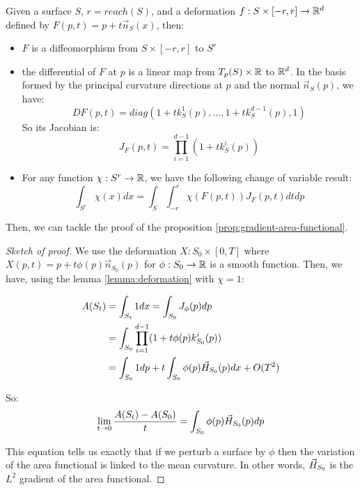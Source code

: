 \begin{lemma}
    \label{lemma:diffeo}

    Given a surface $ S $, $ r = reach(S) $, and a deformation $ f : S \times
    [-r, r] \to \mathbb{R}^d $ defined by $ F(p, t) = p + t \vec{n}_S(x) $, then:

    \begin{itemize}
        \item $ F $ is a diffeomorphism from $ S \times [-r, r] $ to $ S^r $
        \item the differential of $ F $ at $ p $ is a linear map from $ T_p(S)
            \times \mathbb{R} $ to $ \mathbb{R}^d $. In the basis formed by the principal
            curvature directions at $ p $ and the normal $ \vec{n}_S(p) $, we have:
            \begin{equation}
                D F(p, t) = diag(1 + t k^1_S(p), \ldots, 1 + t k^{d-1}_S(p), 1)
            \end{equation}
            So its Jacobian is:
            \begin{equation}
                J_F(p, t) = \prod_{i=1}^{d-1} (1 + t k^i_S(p))
            \end{equation}
        \item For any function $ \chi : S^r \to \mathbb{R} $, we have the following
            change of variable result:
            \begin{equation}
                \int_{S^r} \chi(x) dx = \int_S \int_{-r}^r \chi(F(p, t)) J_F(p,
                t) dt dp
            \end{equation}
    \end{itemize}
\end{lemma}

Then, we can tackle the proof of the proposition
\ref{prop:gradient-area-functional}.

\begin{proof}[Sketch of proof]
    We use the deformation $ X : S_0 \times [0, T] $ where $ X(p, t) = p + t
    \phi(p) \vec{n}_{S_0}(p) $ for $ \phi : S_0 \to \mathbb{R} $ is a smooth
    function. Then, we have, using the lemma \ref{lemma:deformation} with $ \chi
    = 1 $:

    \begin{align*}
        A(S_t) &= \int_{S_t} 1 dx = \int_{S_0} J_{\phi}(p) dp \\
        &= \int_{S_0} \prod_{i=1}^{d-1} (1 + t \phi(p) k^i_{S_0}(p)) \\
        &= \int_{S_0} 1 dp + t \int_{S_0} \phi(p) \vec{H}_{S_0}(p) dx + O(T^2)
    \end{align*}

    So:
    $$ \lim\limits_{t \to 0} \frac{A(S_t) - A(S_0)}{t}= \int_{S_0}
    \phi(p) \vec{H}_{S_0}(p) dp $$

    This equation tells us exactly that if we perturb a surface by $ \phi $
    then the variation of the area functional is linked to the mean curvature.
    In other words, $ \vec{H}_{S_0} $ is the $ L^2 $ gradient of the area
    functional.
\end{proof}

